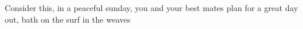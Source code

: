 Consider this, in a peaceful sunday, you and your best mates plan for a great day out, bath on the surf in the weaves  